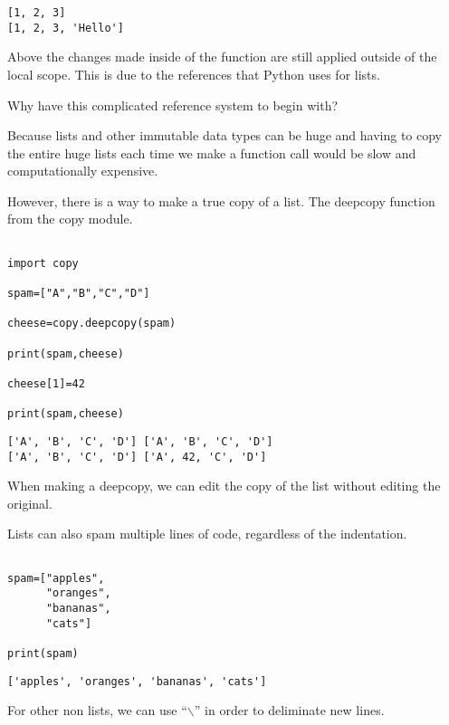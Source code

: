 \documentclass[11pt]{article}
\begin{document}
\begin{verbatim}
[1, 2, 3]
[1, 2, 3, 'Hello']
\end{verbatim}


Above the changes made inside of the function are still applied outside of the local scope. This is due to the references that Python uses for lists.

Why have this complicated reference system to begin with?

Because lists and other immutable data types can be huge and having to copy the entire huge lists each time we make a function call would be slow and computationally expensive.

However, there is a way to make a true copy of a list. The deepcopy function from the copy module.

\begin{verbatim}

import copy

spam=["A","B","C","D"]

cheese=copy.deepcopy(spam)

print(spam,cheese)

cheese[1]=42

print(spam,cheese)

\end{verbatim}

\begin{verbatim}
['A', 'B', 'C', 'D'] ['A', 'B', 'C', 'D']
['A', 'B', 'C', 'D'] ['A', 42, 'C', 'D']
\end{verbatim}


When making a deepcopy, we can edit the copy of the list without editing the original.


Lists can also spam multiple lines of code, regardless of the indentation.

\begin{verbatim}

spam=["apples",
      "oranges",
      "bananas",
      "cats"]

print(spam)

\end{verbatim}

\begin{verbatim}
['apples', 'oranges', 'bananas', 'cats']
\end{verbatim}


For other non lists, we can use ``$\backslash$'' in order to deliminate new lines.
\end{document}
